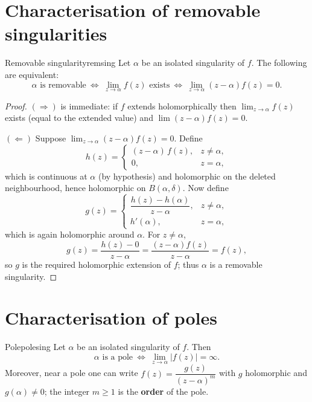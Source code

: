 \documentclass[11pt,openany]{report}
\newcommand{\abs}[1]{\left\lvert #1 \right\rvert}
\begin{document}
\section{Characterisation of removable singularities}

\begin{theorem}{Removable singularity}{remsing}
Let $\alpha$ be an isolated singularity of $f$. The following are equivalent:
\[
  \alpha \text{ is removable} \ \Longleftrightarrow\ \lim_{z\to\alpha} f(z) \text{ exists}
  \ \Longleftrightarrow\ \lim_{z\to\alpha}(z-\alpha)f(z) = 0 .
\]
\end{theorem}

\begin{proof}
$(\Rightarrow)$ is immediate: if $f$ extends holomorphically then $\lim_{z\to\alpha}f(z)$
exists (equal to the extended value) and $\lim(z-\alpha)f(z)=0$.

$(\Leftarrow)$ Suppose $\lim_{z\to\alpha}(z-\alpha)f(z)=0$. Define
\[
  h(z) =
  \begin{cases}
    (z-\alpha)\,f(z), & z\ne\alpha,\\
    0, & z=\alpha,
  \end{cases}
\]
which is continuous at $\alpha$ (by hypothesis) and holomorphic on the deleted
neighbourhood, hence holomorphic on $B(\alpha,\delta)$. Now define
\[
  g(z) =
  \begin{cases}
    \dfrac{h(z)-h(\alpha)}{z-\alpha}, & z\ne\alpha,\\[8pt]
    h'(\alpha), & z=\alpha,
  \end{cases}
\]
which is again holomorphic around $\alpha$. For $z\ne\alpha$,
\[
  g(z) = \frac{h(z)-0}{z-\alpha} = \frac{(z-\alpha)f(z)}{z-\alpha} = f(z),
\]
so $g$ is the required holomorphic extension of $f$; thus $\alpha$ is a removable
singularity.
\end{proof}

\section{Characterisation of poles}

\begin{theorem}{Pole}{polesing}
Let $\alpha$ be an isolated singularity of $f$. Then
\[
  \alpha \text{ is a pole} \ \Longleftrightarrow\ \lim_{z\to\alpha}\abs{f(z)} = \infty .
\]
Moreover, near a pole one can write $f(z)=\dfrac{g(z)}{(z-\alpha)^{m}}$ with $g$ holomorphic
and $g(\alpha)\ne0$; the integer $m\ge1$ is the \textbf{order} of the pole.
\end{theorem}
\end{document}
